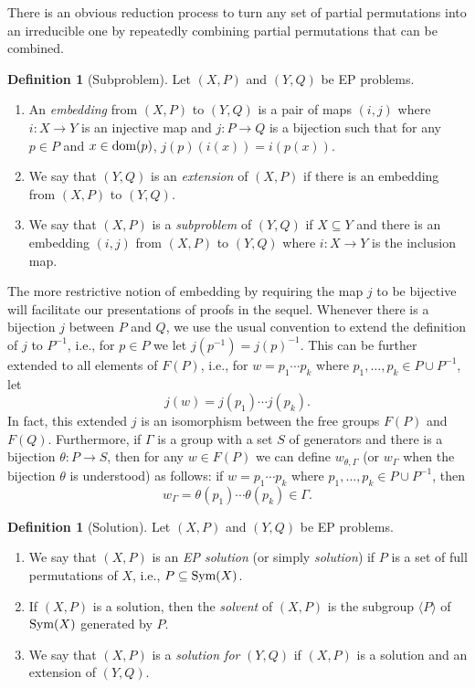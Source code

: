 \documentclass[11pt]{amsart}
\theoremstyle{definition}
\newtheorem{definition}[theorem]{Definition}
\newcommand{\dom}{{\mbox{\rm dom}}}
\theoremstyle{definition}
\numberwithin{equation}{section}
\begin{document}
There is an obvious reduction process to turn any set of partial permutations into an irreducible one by repeatedly combining partial permutations that can be combined. 

\begin{definition}[Subproblem]\label{def:subproblem} Let $(X, P)$ and $(Y, Q)$ be EP problems.
\begin{enumerate}
\item[(1)] An {\em embedding} from $(X, P)$ to $(Y, Q)$ is a pair of maps $(i, j)$ where $i\colon X\to Y$ is an injective map and $j\colon P\to Q$ is a bijection such that for any $p\in P$ and $x\in \dom(p)$, $j(p)(i(x))=i(p(x))$.
\item[(2)] We say that $(Y, Q)$ is an {\em extension} of $(X, P)$ if there is an embedding from $(X, P)$ to $(Y, Q)$.
\item[(3)] We say that $(X, P)$ is a {\em subproblem} of $(Y, Q)$ if $X\subseteq Y$ and there is an embedding $(i,j)$ from $(X, P)$ to $(Y, Q)$ where $i\colon X\to Y$ is the inclusion map.
\end{enumerate}
\end{definition}

The more restrictive notion of embedding by requiring the map $j$ to be bijective will facilitate our presentations of proofs in the sequel. Whenever there is a bijection $j$ between $P$ and $Q$, we use the usual convention to extend the definition of $j$ to $P^{-1}$, i.e., for $p\in P$ we let $j(p^{-1})=j(p)^{-1}$. This can be further extended to all elements of $F(P)$, i.e., for $w=p_1\cdots p_k$ where $p_1, \dots, p_k\in P\cup P^{-1}$, let 
$$ j(w)=j(p_1)\cdots j(p_k). $$ In fact, this extended $j$ is an isomorphism between the free groups $F(P)$ and $F(Q)$. Furthermore, if $\Gamma$ is a group with a set $S$ of generators and there is a bijection $\theta\colon P\to S$, then for any $w\in F(P)$ we can define $w_{\theta, \Gamma}$ (or $w_\Gamma$ when the bijection $\theta$ is understood) as follows: if $w=p_1\cdots p_k$ where $p_1,\dots, p_k\in P\cup P^{-1}$, then
$$ w_\Gamma=\theta(p_1)\cdots \theta(p_k)\in \Gamma. $$

\begin{definition}[Solution]\label{def:solution} Let $(X, P)$ and $(Y, Q)$ be EP problems.
\begin{enumerate}
\item[(1)] We say that $(X, P)$ is an {\em EP solution} (or simply {\em solution}) if $P$ is a set of full permutations of $X$, i.e., $P\subseteq \mbox{\rm Sym}(X)$. 
\item[(2)] If $(X, P)$ is a solution, then the {\em solvent} of $(X, P)$ is the subgroup $\langle P\rangle$ of $\mbox{\rm Sym}(X)$ generated by $P$.
\item[(3)] We say that $(X, P)$ is a {\em solution for} $(Y, Q)$ if $(X, P)$ is a solution and an extension of $(Y, Q)$.
\end{enumerate}
\end{definition}
\end{document}
